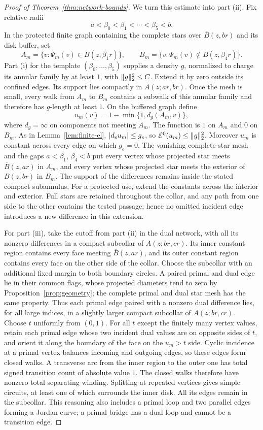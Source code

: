 \begin{proof}[Proof of Theorem~\ref{thm:network-bounds}]
We turn this estimate into part (ii).  Fix relative radii
\[
 a<\beta_0<\beta_1<\cdots<\beta_5<b.
\]
In the protected finite graph containing the complete stars over
\(\overline B(z,br)\) and its disk buffer, set
\[
 A_m=\{v:\Psi_m(v)\in\overline B(z,\beta_1r)\},
 \qquad
 B_m=\{v:\Psi_m(v)\notin B(z,\beta_4r)\}.
\]
Part (i) for the template \((\beta_0,\ldots,\beta_5)\) supplies a density
\(g\), normalized to charge its annular family by at least \(1\), with
\(\lVert g\rVert_2^2\le C\).  Extend it by zero outside its confined edges.
Its support lies compactly in \(A(z;ar,br)\).  Once the mesh is small,
every walk from \(A_m\) to \(B_m\) contains a subwalk of this annular
family and therefore has \(g\)-length at least \(1\).  On the buffered
graph define
\[
 u_m(v)=1-\min\{1,d_g(A_m,v)\},
\]
where \(d_g=\infty\) on components not meeting \(A_m\).  The function is
\(1\) on \(A_m\) and \(0\) on \(B_m\).  As in Lemma~\ref{lem:finite-el},
\(\lvert d_eu_m\rvert\le g_e\), so \(\mathcal E^0(u_m)\le\lVert g\rVert_2^2\).
Moreover \(u_m\) is constant across every edge on which \(g_e=0\).
The vanishing complete-star mesh and the gaps \(a<\beta_1\),
\(\beta_4<b\) put every vertex whose projected star meets
\(\overline B(z,ar)\) in \(A_m\), and every vertex whose projected star
meets the exterior of \(B(z,br)\) in \(B_m\).  The support of the
differences remains inside the stated compact subannulus.
For a protected use, extend the constants across the interior and
exterior.  Full stars are retained throughout the collar, and any path
from one side to the other contains the tested passage; hence no omitted
incident edge introduces a new difference in this extension.

For part (iii), take the cutoff from part (ii) in the dual network, with
all its nonzero differences in a compact subcollar of \(A(z;br,cr)\).
Its inner constant region contains every face meeting
\(\overline B(z,ar)\), and its outer constant region contains every face
on the other side of the collar.  Choose the subcollar with an additional
fixed margin to both boundary circles.  A paired primal and dual edge
lie in their common flags, whose projected diameters tend to zero by
Proposition~\ref{prop:geometry}; the complete primal and dual star mesh
has the same property.  Thus each primal edge paired with a nonzero dual
difference lies, for all large indices, in a slightly larger compact
subcollar of \(A(z;br,cr)\).  Choose \(t\) uniformly from \((0,1)\).
For all \(t\) except the finitely many vertex values, retain each primal
edge whose two incident dual values are on opposite sides of \(t\), and
orient it along the boundary of the face on the \(u_m>t\) side.  Cyclic
incidence at a primal vertex balances incoming and outgoing edges, so
these edges form closed walks.  A transverse arc from the inner region
to the outer one has total signed transition count of absolute value \(1\).
The closed
walks therefore have nonzero total separating winding.  Splitting at
repeated vertices gives simple circuits, at least one of which surrounds
the inner disk.  All its edges remain in the subcollar.  This reasoning
also includes a primal loop and two parallel edges forming a Jordan
curve; a primal bridge has a dual loop and cannot be a transition edge.


\end{proof}
